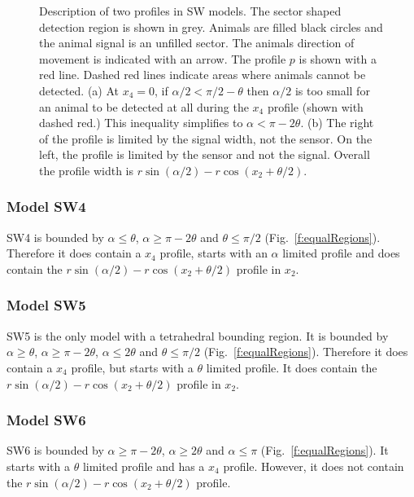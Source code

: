 \begin{figure}[t]
\caption[Description of two profiles in SW models]{Description of two profiles in SW models. The sector shaped detection region is shown in grey. Animals are filled black circles and the animal signal is an unfilled sector. The animals direction of movement is indicated with an arrow. The profile $p$ is shown with a red line. Dashed red lines indicate areas where animals cannot be detected. (a) At $x_4 = 0$, if $\alpha/2 < \pi/2 - \theta$ then $\alpha/2$ is too small for an animal to be detected at all during the $x_4$ profile (shown with dashed red.) This inequality simplifies to $\alpha < \pi - 2\theta$. (b) The right of the profile is limited by the signal width, not the sensor. On the left, the profile is limited by the sensor and not the signal. Overall the profile width is $r\sin(\alpha/2) - r\cos(x_2 + \theta/2)$.     }
\label{f:SW4--9}
\end{figure}

\subsubsection{Model SW4} \label{SW4}

SW4 is bounded by $\alpha \le \theta$, $\alpha \ge \pi - 2\theta$ and $\theta \le \pi/2$ (Fig.~\ref{f:equalRegions}). Therefore it does contain a $x_4$ profile, starts with an $\alpha$ limited profile and does contain the $r\sin(\alpha/2) - r\cos(x_2 + \theta/2)$ profile in $x_2$.



\subsubsection{Model SW5} \label{SW5}

SW5 is the only model with a tetrahedral bounding region. It is bounded by $\alpha \ge \theta$, $\alpha \ge \pi - 2\theta$, $\alpha \le 2\theta$ and $\theta \le \pi/2$ (Fig.~\ref{f:equalRegions}). Therefore it does contain a $x_4$ profile, but starts with a $\theta$ limited profile. It does contain the $r\sin(\alpha/2) - r\cos(x_2 + \theta/2)$ profile in $x_2$.



\subsubsection{Model SW6} \label{SW6}

SW6 is bounded by $\alpha \ge \pi - 2\theta$,  $\alpha \ge 2\theta$ and $\alpha \le \pi$ (Fig.~\ref{f:equalRegions}). It starts with a $\theta$ limited profile and has a $x_4$ profile. However, it does not contain the $r\sin(\alpha/2) - r\cos(x_2 + \theta/2)$ profile.

